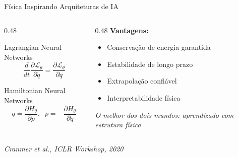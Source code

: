 \documentclass[aspectratio=169,12pt]{beamer}
\begin{document}
\begin{frame}{Física Inspirando Arquiteturas de IA}
    \begin{columns}[T]
        \begin{column}{0.48\textwidth}
            \begin{block}{Lagrangian Neural Networks}
                \begin{equation*}
                    \frac{d}{dt}\frac{\partial \mathcal{L}_\theta}{\partial \dot{q}} = \frac{\partial \mathcal{L}_\theta}{\partial q}
                \end{equation*}
            \end{block}
            \begin{block}{Hamiltonian Neural Networks}
                \begin{equation*}
                    \dot{q} = \frac{\partial H_\theta}{\partial p}, \;\;
                    \dot{p} = -\frac{\partial H_\theta}{\partial q}
                \end{equation*}
            \end{block}
        \end{column}
        \begin{column}{0.48\textwidth}
            \textbf{Vantagens:}
            \begin{itemize}
                \item Conservação de energia garantida
                \item Estabilidade de longo prazo
                \item Extrapolação confiável
                \item Interpretabilidade física
            \end{itemize}

            \vspace{0.2cm}

            \textit{O melhor dos dois mundos: aprendizado com estrutura física}
        \end{column}
    \end{columns}
    \vspace{0.1cm}
    \begin{center}
        \small\textit{Cranmer et al., ICLR Workshop, 2020}
    \end{center}
\end{frame}
\end{document}
